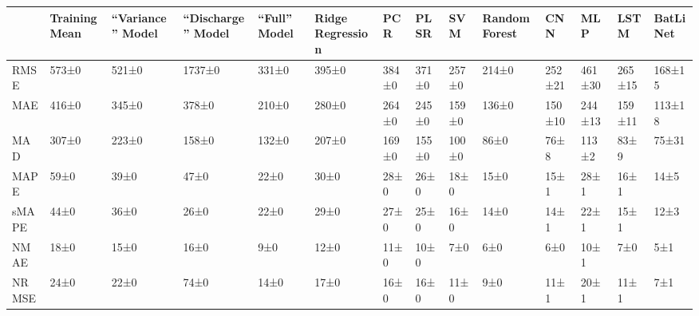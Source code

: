 \begin{tabular}{llllllllllllll}
\toprule
 & Training Mean & ``Variance'' Model & ``Discharge'' Model & ``Full'' Model & Ridge Regression & PCR & PLSR & SVM & Random Forest & CNN & MLP & LSTM & BatLiNet \\
\midrule
RMSE & 573±0 & 521±0 & 1737±0 & 331±0 & 395±0 & 384±0 & 371±0 & 257±0 & 214±0 & 252±21 & 461±30 & 265±15 & 168±15 \\
MAE & 416±0 & 345±0 & 378±0 & 210±0 & 280±0 & 264±0 & 245±0 & 159±0 & 136±0 & 150±10 & 244±13 & 159±11 & 113±18 \\
MAD & 307±0 & 223±0 & 158±0 & 132±0 & 207±0 & 169±0 & 155±0 & 100±0 & 86±0 & 76±8 & 113±2 & 83±9 & 75±31 \\
MAPE & 59±0 & 39±0 & 47±0 & 22±0 & 30±0 & 28±0 & 26±0 & 18±0 & 15±0 & 15±1 & 28±1 & 16±1 & 14±5 \\
sMAPE & 44±0 & 36±0 & 26±0 & 22±0 & 29±0 & 27±0 & 25±0 & 16±0 & 14±0 & 14±1 & 22±1 & 15±1 & 12±3 \\
NMAE & 18±0 & 15±0 & 16±0 & 9±0 & 12±0 & 11±0 & 10±0 & 7±0 & 6±0 & 6±0 & 10±1 & 7±0 & 5±1 \\
NRMSE & 24±0 & 22±0 & 74±0 & 14±0 & 17±0 & 16±0 & 16±0 & 11±0 & 9±0 & 11±1 & 20±1 & 11±1 & 7±1 \\
\bottomrule
\end{tabular}
